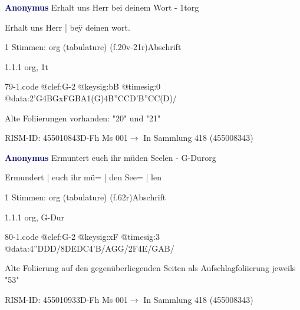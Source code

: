 \documentclass[twocolumn]{book}
\begin{document}
\par \vspace{7pt} \textcolor{darkblue}{\textbf{Anonymus  }}\hfillplus{\textbf{[79]}}\newline Erhalt uns Herr bei deinem Wort - 1t\newline org
\par \begin{itshape}[f.20r, at left:] Erhalt uns Herr | beÿ deinen wort.\end{itshape} 
\par \textcolor{darkblue}{}  1 Stimmen: org (tabulature)  (f.20v-21r)\newline Abschrift
\par 1.1.1  org, 1t  
\begin{filecontents*}{79-1.code}
@clef:G-2
@keysig:bB
@timesig:0
@data:2'G4BGxFGBA1(G)4B''CCD'B''CC(D)/
\end{filecontents*}
\newline
%
\par Alte Foliierungen vorhanden: "20" und "21"
\par RISM-ID: 455010843\newline D-Fh  Ms 001\newline $\rightarrow$ In Sammlung 418 (455008343)
      
\par \vspace{7pt} \textcolor{darkblue}{\textbf{Anonymus  }}\hfillplus{\textbf{[80]}}\newline Ermuntert euch ihr müden Seelen - G-Dur\newline org
\par \begin{itshape}[f.62r, at left:] Ermundert | euch ihr mü= | den See= | len\end{itshape} 
\par \textcolor{darkblue}{}  1 Stimmen: org (tabulature)  (f.62r)\newline Abschrift
\par 1.1.1  org, G-Dur  
\begin{filecontents*}{80-1.code}
@clef:G-2
@keysig:xF
@timesig:3
@data:4''DDD/{8DEDC}4'B/AGG/2F4E/GAB/
\end{filecontents*}
\newline
%
\par Alte Foliierung auf den gegenüberliegenden Seiten als Aufschlagfoliierung jeweils "53"
\par RISM-ID: 455010933\newline D-Fh  Ms 001\newline $\rightarrow$ In Sammlung 418 (455008343)
      
\end{document}
